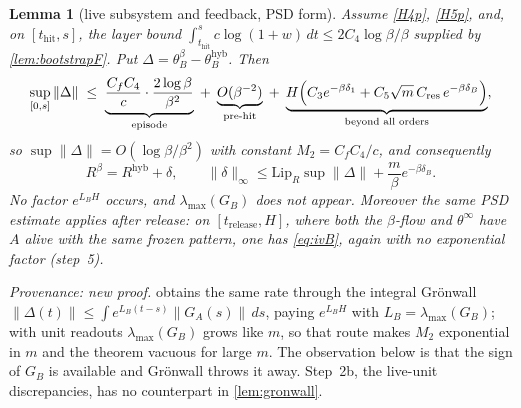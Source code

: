 \documentclass[11pt]{article}
\newtheorem{lemma}[lemma]{Lemma}
\theoremstyle{definition}
\theoremstyle{remark}
\newcommand{\thit}{t_{\mathrm{hit}}}
\newcommand{\trel}{t_{\mathrm{release}}}
\newcommand{\hyb}{\mathrm{hyb}}
\begin{document}
\begin{lemma}[live subsystem and feedback, PSD form]\label{lem:gronwallF}
Assume \textup{\eqref{H4p}}, \textup{\eqref{H5p}}, and, on $[\thit,s]$, the layer bound
$\int_{\thit}^{s}c\log(1+w)\,dt\le 2C_4\log\beta/\beta$ supplied by
\cref{lem:bootstrapF}. Put $\Delta=\theta_B^\beta-\theta_B^{\hyb}$. Then
\begin{equation}\label{eq:BrateF}
\sup_{[0,s]}\|\Delta\|
\;\le\;\underbrace{\frac{C_fC_4}{c}\cdot\frac{2\log\beta}{\beta^2}}_{\text{episode}}
\;+\;\underbrace{O(\beta^{-2})}_{\text{pre-hit}}
\;+\;\underbrace{H\Bigl(C_3e^{-\beta\delta_1}
   +C_5\sqrt m\,C_{\mathrm{res}}\,e^{-\beta\delta_B}\Bigr)}_{\text{beyond all orders}} ,
\end{equation}
so $\sup\|\Delta\|=O(\log\beta/\beta^2)$ with constant $M_2=C_fC_4/c$, and
consequently
\begin{equation}\label{eq:RpertF}
R^\beta=R^{\hyb}+\delta,\qquad
\|\delta\|_\infty\le\mathrm{Lip}_R\sup\|\Delta\|
+\frac{m}{\beta}e^{-\beta\delta_B} .
\end{equation}
\emph{No factor $e^{L_BH}$ occurs, and $\lambda_{\max}(G_B)$ does not appear.}
Moreover the same PSD estimate applies after release: on $[\trel,H]$, where both
the $\beta$-flow and $\theta^\infty$ have $A$ alive with the same frozen
pattern, one has \eqref{eq:ivB}, again with no exponential factor (step~5).
\end{lemma}

\noindent\emph{Provenance: new proof.}  obtains the same rate
through the integral Gr\"onwall
$\|\Delta(t)\|\le\int e^{L_B(t-s)}\|G_A(s)\|\,ds$, paying $e^{L_BH}$ with
$L_B=\lambda_{\max}(G_B)$; with unit readouts $\lambda_{\max}(G_B)$ grows like
$m$, so that route makes $M_2$ exponential in $m$ and the theorem vacuous for
large $m$. The observation below is that the sign of $G_B$ is available and
Gr\"onwall throws it away. Step~2b, the live-unit discrepancies, has no
counterpart in \cref{lem:gronwall}.
\end{document}
